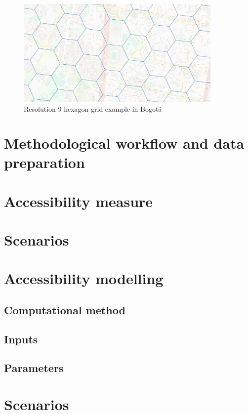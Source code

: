 \documentclass[12pt, a4paper]{report}
\begin{document}
\begin{figure}[H]
    \centering
    \includegraphics[width=10cm]{Images/Hex_grid.png}
    \caption{Resolution 9 hexagon grid example in Bogotá \citep{ubertechnologiesH3HexagonalHierarchical2023}}
    \label{fig:Hex_grid_example}
\end{figure}

\section{Methodological workflow and data preparation}

\section{Accessibility measure}

\section{Scenarios}

\section{Accessibility modelling}


\subsection{Computational method}

\subsection{Inputs}

\subsection{Parameters}


\section{Scenarios}
\end{document}

